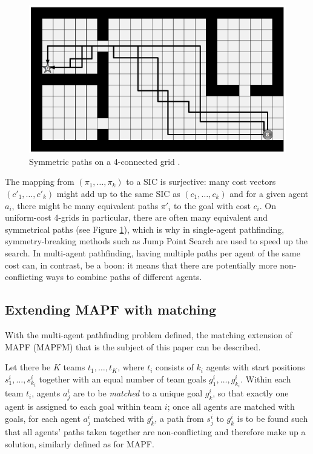 \documentclass[english]{article}
\begin{document}
	\begin{figure}
		\vspace{-10pt}
		\centering
		\includegraphics[width=\linewidth]{img/symmetries}
		\caption{Symmetric paths on a 4-connected grid \cite{harabor2010}.}
		\label{fig:symmetries}
	\end{figure}
	The mapping from $(\pi_1,\ldots,\pi_k)$ to a SIC is surjective: many cost vectors $(c'_1,\ldots,c'_k)$ might add up to the same SIC as $(c_1,\ldots,c_k)$ and for a given agent $a_i$, there might be many equivalent paths $\pi'_i$ to the goal with cost $c_i$. On uniform-cost 4-grids in particular, there are often many equivalent and symmetrical paths \cite{harabor2010} (see Figure \ref{fig:symmetries}), which is why in single-agent pathfinding, symmetry-breaking methods such as Jump Point Search \cite{harabor2011} are used to speed up the search. In multi-agent pathfinding, having multiple paths per agent of the same cost can, in contrast, be a boon: it means that there are potentially more non-conflicting ways to combine paths of different agents.
	
	\subsection{Extending MAPF with matching}
	With the multi-agent pathfinding problem defined, the matching extension of MAPF (MAPFM) that is the subject of this paper can be described.
	
	Let there be $K$ teams $t_1,\ldots, t_K$, where $t_i$ consists of $k_i$ agents with start positions $s_1^i,\ldots,s_{k_i}^i$ together with an equal number of team goals $g_1^i,\ldots,g_{k_i}^i$. Within each team $t_i$, agents $a_j^i$ are to be \textit{matched} to a unique goal $g_k^i$, so that exactly one agent is assigned to each goal within team $i$; once all agents are matched with goals, for each agent $a_j^i$ matched with $g_k^i$, a path from $s_j^i$ to $g_k^i$ is to be found such that all agents' paths taken together are non-conflicting and therefore make up a solution, similarly defined as for MAPF.
	
\end{document}

